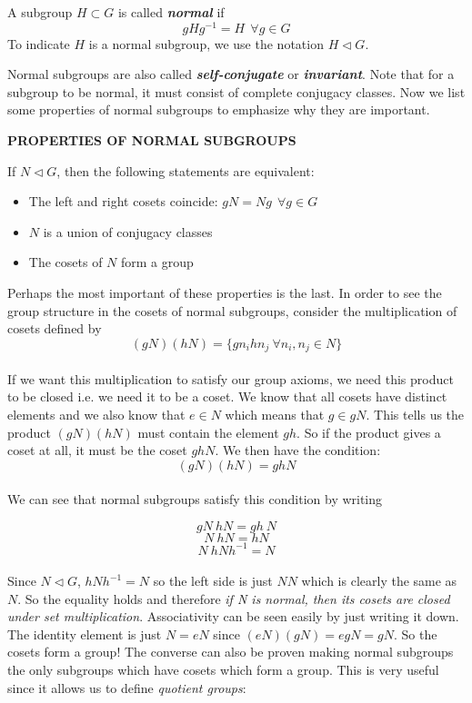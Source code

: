 \documentclass[9 pt]{report}
\begin{document}
\begin{tcolorbox}
	A subgroup $H\subset G$ is called \textbf{\emph{normal}} if 
	$$ gHg^{-1} = H \:\:\forall g\in G $$
	To indicate $H$ is a normal subgroup, we use the notation $H \triangleleft G$. 
\end{tcolorbox}
Normal subgroups are also called \textbf{\emph{self-conjugate}} or \textbf{\emph{invariant}}. Note that for a subgroup to be normal, it must consist of complete conjugacy classes. Now we list some properties of normal subgroups to emphasize why they are important.

\begin{center}
	\textbf{PROPERTIES OF NORMAL SUBGROUPS}
\end{center}
If $N \triangleleft G$, then the following statements are equivalent:
\begin{itemize}
	\item The left and right cosets coincide: $gN = Ng \:\:\forall g\in G$
	\item $N$ is a union of conjugacy classes
	\item The cosets of $N$ form a group
\end{itemize}
Perhaps the most important of these properties is the last. In order to see the group structure in the cosets of normal subgroups, consider the multiplication of cosets defined by
$$ (g N)( hN) = \{ gn_i hn_j \: \forall n_i, n_j \in N \} $$
\\
If we want this multiplication to satisfy our group axioms, we need this product to be closed i.e. we need it to be a coset. We know that all cosets have distinct elements and we also know that $e\in N$ which means that $g \in gN$. This tells us the product $(gN)(hN)$ must contain the element $gh$. So if the product gives a coset at all, it must be the coset $ghN$. We then have the condition:
$$(gN)(hN) = gh N $$
\\
We can see that normal subgroups satisfy this condition by writing

$$ gN \: hN = gh\:N $$
$$ N\:hN = hN $$
$$ N\:hNh^{-1} = N $$
\\
Since $N\triangleleft G$, $hNh^{-1} = N$ so the left side is just $NN$ which is clearly the same as $N$. So the equality holds and therefore \emph{if N is normal, then its cosets are closed under set multiplication}. Associativity can be seen easily by just writing it down. The identity element is just $N=eN$ since $(eN)(gN) = eg N = gN$. So the cosets form a group! The converse can also be proven making normal subgroups the only subgroups which have cosets which form a group. This is very useful since it allows us to define \emph{quotient groups}:
\end{document}
